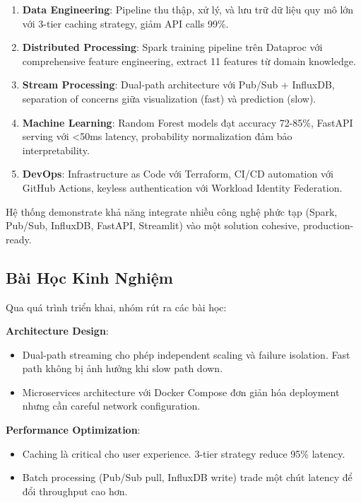 \documentclass[conference,10pt]{IEEEtran}
\begin{document}
\begin{enumerate}
    \item \textbf{Data Engineering}: Pipeline thu thập, xử lý, và lưu trữ dữ liệu quy mô lớn với 3-tier caching strategy, giảm API calls 99\%.

    \item \textbf{Distributed Processing}: Spark training pipeline trên Dataproc với comprehensive feature engineering, extract 11 features từ domain knowledge.

    \item \textbf{Stream Processing}: Dual-path architecture với Pub/Sub + InfluxDB, separation of concerns giữa visualization (fast) và prediction (slow).

    \item \textbf{Machine Learning}: Random Forest models đạt accuracy 72-85\%, FastAPI serving với <50ms latency, probability normalization đảm bảo interpretability.

    \item \textbf{DevOps}: Infrastructure as Code với Terraform, CI/CD automation với GitHub Actions, keyless authentication với Workload Identity Federation.
\end{enumerate}

Hệ thống demonstrate khả năng integrate nhiều công nghệ phức tạp (Spark, Pub/Sub, InfluxDB, FastAPI, Streamlit) vào một solution cohesive, production-ready.

\subsection{Bài Học Kinh Nghiệm}

Qua quá trình triển khai, nhóm rút ra các bài học:

\textbf{Architecture Design}:
\begin{itemize}
    \item Dual-path streaming cho phép independent scaling và failure isolation. Fast path không bị ảnh hưởng khi slow path down.
    \item Microservices architecture với Docker Compose đơn giản hóa deployment nhưng cần careful network configuration.
\end{itemize}

\textbf{Performance Optimization}:
\begin{itemize}
    \item Caching là critical cho user experience. 3-tier strategy reduce 95\% latency.
    \item Batch processing (Pub/Sub pull, InfluxDB write) trade một chút latency để đổi throughput cao hơn.
\end{itemize}
\end{document}
